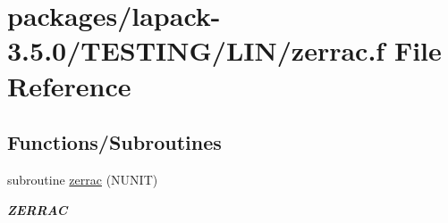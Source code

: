 \hypertarget{zerrac_8f}{}\section{packages/lapack-\/3.5.0/\+T\+E\+S\+T\+I\+N\+G/\+L\+I\+N/zerrac.f File Reference}
\label{zerrac_8f}
\subsection*{Functions/\+Subroutines}
\begin{DoxyCompactItemize}
\item 
subroutine \hyperlink{group__complex16__lin_ga99a8ca595cf654686ebfd50910813434}{zerrac} (N\+U\+N\+I\+T)
\begin{DoxyCompactList}\small\item\em {\bfseries Z\+E\+R\+R\+A\+C} \end{DoxyCompactList}\end{DoxyCompactItemize}
